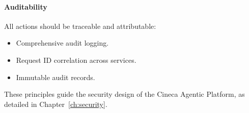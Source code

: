 \paragraph{Auditability}

All actions should be traceable and attributable:
\begin{itemize}
    \item Comprehensive audit logging.
    \item Request ID correlation across services.
    \item Immutable audit records.
\end{itemize}

These principles guide the security design of the Cineca Agentic Platform, as detailed in Chapter~\ref{ch:security}.
